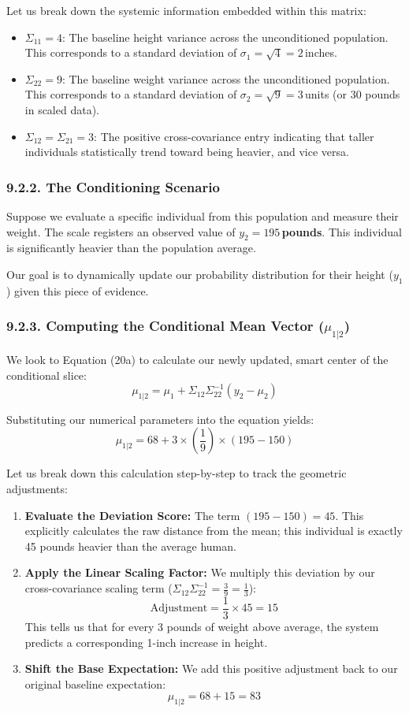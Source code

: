 \documentclass{article}
\begin{document}
Let us break down the systemic information embedded within this matrix:
\begin{itemize}
    \item $\Sigma_{11} = 4$: The baseline height variance across the unconditioned population. This corresponds to a standard deviation of $\sigma_1 = \sqrt{4} = 2$\,inches.
    \item $\Sigma_{22} = 9$: The baseline weight variance across the unconditioned population. This corresponds to a standard deviation of $\sigma_2 = \sqrt{9} = 3$\,units (or 30 pounds in scaled data).
    \item $\Sigma_{12} = \Sigma_{21} = 3$: The positive cross-covariance entry indicating that taller individuals statistically trend toward being heavier, and vice versa.
\end{itemize}

\subsubsection*{9.2.2. The Conditioning Scenario}

Suppose we evaluate a specific individual from this population and measure their weight. The scale registers an observed value of \textbf{$y_2 = 195$\,pounds}. This individual is significantly heavier than the population average. 

Our goal is to dynamically update our probability distribution for their height ($y_1$) given this piece of evidence.

\subsubsection*{9.2.3. Computing the Conditional Mean Vector ($\mu_{1|2}$)}

We look to Equation (20a) to calculate our newly updated, smart center of the conditional slice:
\[ \mu_{1|2} = \mu_1 + \Sigma_{12}\Sigma_{22}^{-1}(y_2 - \mu_2) \]

Substituting our numerical parameters into the equation yields:
\[ \mu_{1|2} = 68 + 3 \times \left(\frac{1}{9}\right) \times (195 - 150) \]

Let us break down this calculation step-by-step to track the geometric adjustments:
\begin{enumerate}
    \item \textbf{Evaluate the Deviation Score:} The term $(195 - 150) = 45$. This explicitly calculates the raw distance from the mean; this individual is exactly 45 pounds heavier than the average human.
    \item \textbf{Apply the Linear Scaling Factor:} We multiply this deviation by our cross-covariance scaling term ($\Sigma_{12}\Sigma_{22}^{-1} = \frac{3}{9} = \frac{1}{3}$):
    \[ \text{Adjustment} = \frac{1}{3} \times 45 = 15 \]
    This tells us that for every 3 pounds of weight above average, the system predicts a corresponding 1-inch increase in height.
    \item \textbf{Shift the Base Expectation:} We add this positive adjustment back to our original baseline expectation:
    \[ \mu_{1|2} = 68 + 15 = 83 \]
\end{enumerate}
\end{document}
